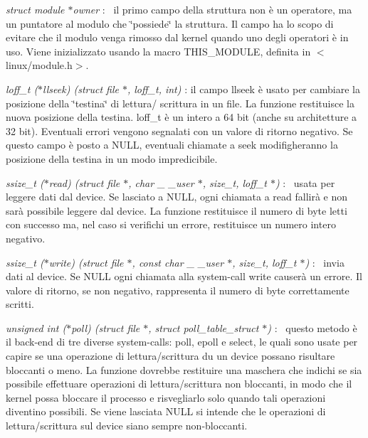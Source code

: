 \begin{DoxyItemize}
\item {\itshape struct module $\ast$owner} \+:~\newline
 il primo campo della struttura non è un operatore, ma un puntatore al modulo che \char`\"{}possiede\char`\"{} la struttura. Il campo ha lo scopo di evitare che il modulo venga rimosso dal kernel quando uno degli operatori è in uso. Viene inizializzato usando la macro T\+H\+I\+S\+\_\+\+M\+O\+D\+U\+LE, definita in $<$linux/module.\+h$>$.
\item {\itshape loff\+\_\+t ($\ast$llseek) (struct file $\ast$, loff\+\_\+t, int)} \+: il campo llseek è usato per cambiare la posizione della \char`\"{}testina\char`\"{} di lettura/ scrittura in un file. La funzione restituisce la nuova posizione della testina. loff\+\_\+t è un intero a 64 bit (anche su architetture a 32 bit). Eventuali errori vengono segnalati con un valore di ritorno negativo. Se questo campo è posto a N\+U\+LL, eventuali chiamate a seek modifigheranno la posizione della testina in un modo impredicibile.
\item {\itshape ssize\+\_\+t ($\ast$read) (struct file $\ast$, char \+\_\+ \+\_\+user $\ast$, size\+\_\+t, loff\+\_\+t $\ast$)} \+:~\newline
 usata per leggere dati dal device. Se lasciato a N\+U\+LL, ogni chiamata a read fallirà e non sarà possibile leggere dal device. La funzione restituisce il numero di byte letti con successo ma, nel caso si verifichi un errore, restituisce un numero intero negativo.
\item {\itshape ssize\+\_\+t ($\ast$write) (struct file $\ast$, const char \+\_\+ \+\_\+user $\ast$, size\+\_\+t, loff\+\_\+t $\ast$)} \+:~\newline
 invia dati al device. Se N\+U\+LL ogni chiamata alla system-\/call write causerà un errore. Il valore di ritorno, se non negativo, rappresenta il numero di byte correttamente scritti.
\item {\itshape unsigned int ($\ast$poll) (struct file $\ast$, struct poll\+\_\+table\+\_\+struct $\ast$)} \+:~\newline
 questo metodo è il back-\/end di tre diverse system-\/calls\+: poll, epoll e select, le quali sono usate per capire se una operazione di lettura/scrittura du un device possano risultare bloccanti o meno. La funzione dovrebbe restituire una maschera che indichi se sia possibile effettuare operazioni di lettura/scrittura non bloccanti, in modo che il kernel possa bloccare il processo e risvegliarlo solo quando tali operazioni diventino possibili. Se viene lasciata N\+U\+LL si intende che le operazioni di lettura/scrittura sul device siano sempre non-\/bloccanti.

\end{DoxyItemize}
